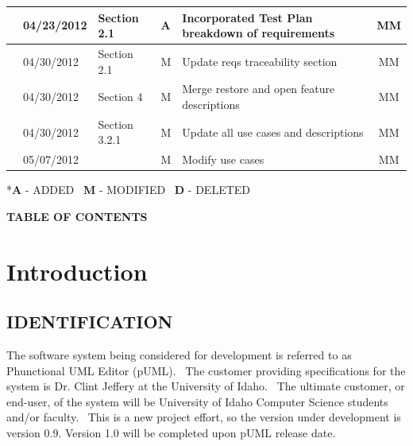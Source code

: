 \documentclass[twoside,letterpaper]{article}
\begin{document}
\begin{flushleft}
\begin{supertabular}[c]{|m{0.75in}|m{1.0in}|m{1.5in}|m{0.25in}|m{2in}|c|}
\\\hline
{}
& 04/23/2012
& Section 2.1
& \centering A
& Incorporated Test Plan breakdown of requirements
& MM

\\\hline
{}
& 04/30/2012
& Section 2.1 
& \centering M
& Update reqs traceability section 
& MM

\\\hline
{}
& 04/30/2012
& Section 4 
& \centering M
& Merge restore and open feature descriptions   
& MM

\\\hline
{}
& 04/30/2012
& Section 3.2.1
& \centering M
& Update all use cases and descriptions
& MM

\\\hline
{}
& 05/07/2012
& 
& \centering M
& Modify use cases
& MM

\\\hline
\end{supertabular}
\end{flushleft}


{ {*}{\textbf{A}}{ - ADDED \ }{\textbf{M}}{ - MODIFIED \ }{\textbf{D}}{ - DELETED}}






\clearpage

{\centering\bfseries TABLE OF CONTENTS \par}


\tableofcontents


\bigskip

\bigskip

\setcounter{page}{1}\pagestyle{Convertiv}





\clearpage\clearpage\setcounter{page}{1}\pagestyle{Convertii}
\section[Introduction]{\bfseries
Introduction}

\subsection[IDENTIFICATION]{\bfseries
IDENTIFICATION}
{
The software system being considered for development is referred to as Phunctional UML Editor (pUML). \ The customer providing specifications
for the system is Dr. Clint Jeffery at the University of Idaho. \ The ultimate
customer, or end-user, of the system will be University of Idaho Computer Science students and/or faculty. \ This is a new project effort, so the version under development is version 0.9.
\newline Version 1.0 will be completed upon pUML release date.}
\end{document}
